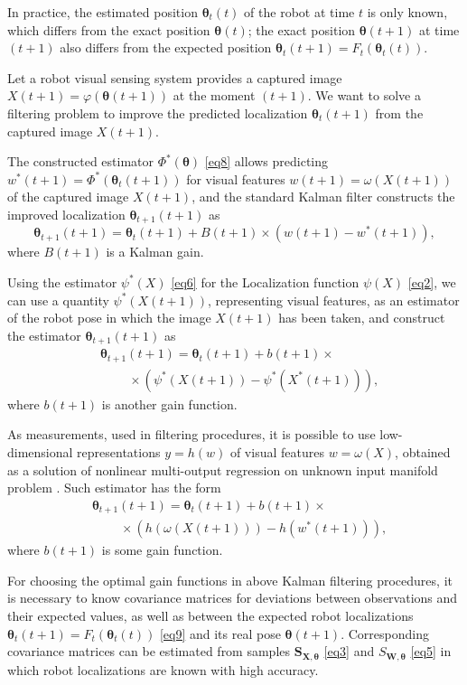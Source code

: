 \documentclass[conference]{IEEEtran} %
\def\mbtheta{{\bm\theta}}
\def\mbS{\mathbf{S}}
\begin{document}
In practice, the estimated position $\mbtheta_t(t)$ of the robot at time $t$ is only known, which differs from the exact position $\mbtheta(t)$; the exact position $\mbtheta(t+1)$ at time $(t+1)$ also differs from the expected position $\mbtheta_t(t+1) = F_t(\mbtheta_t(t))$.

Let a robot visual sensing system provides a captured image $X(t+1) = \varphi(\mbtheta(t+1))$ at the moment $(t+1)$. We want to solve a filtering problem to improve the predicted localization $\mbtheta_t(t+1)$ from the captured image $X(t+1)$.

The constructed estimator $\Phi^*(\mbtheta)$ \eqref{eq8} allows predicting $w^*(t+1) = \Phi^*(\mbtheta_t(t+1))$ for visual features $w(t+1) = \omega(X(t+1))$ of the captured image $X(t+1)$, and the standard Kalman filter \cite{bib5} constructs the improved localization $\mbtheta_{t+1}(t+1)$ as
\begin{equation*}
	\mbtheta_{t+1}(t+1) = \mbtheta_t(t+1) + B(t+1)\times(w(t+1) - w^*(t+1)),
\end{equation*}
where $B(t+1)$ is a Kalman gain.

Using the estimator $\psi^*(X)$ \eqref{eq6} for the Localization function $\psi(X)$ \eqref{eq2}, we can use a quantity $\psi^*(X(t+1))$, representing visual features, as an estimator of the robot pose in which the image $X(t+1)$ has been taken, and construct the estimator $\mbtheta_{t+1}(t+1)$ as
\begin{eqnarray*}
	&\mbtheta_{t+1}(t+1) = \mbtheta_t(t+1) + b(t+1)\times \\ & \;\;\;\;\;\;\;\;
    \times(\psi^*(X(t+1)) - \psi^*(X^*(t+1))),
\end{eqnarray*}
where $b(t+1)$ is another gain function.

As measurements, used in filtering procedures, it is possible to use low-dimensional representations $y = h(w)$ of visual features $w = \omega(X)$, obtained as a solution of nonlinear multi-output regression on unknown input manifold problem \cite{bib20}. Such estimator has the form
\begin{eqnarray*}
	& \mbtheta_{t+1}(t+1) = \mbtheta_t(t+1) + b(t+1)\times\\
     & \;\;\;\;\;\;\;\; \times(h(\omega(X(t+1))) - h(w^*(t+1))),
\end{eqnarray*}
where $b(t+1)$ is some gain function.

For choosing the optimal gain functions in above Kalman filtering procedures, it is necessary to know covariance matrices for deviations between observations and their expected values, as well as between the expected robot localizations $\mbtheta_t(t+1) = F_t(\mbtheta_t(t))$ \eqref{eq9} and its real pose $\mbtheta(t+1)$. Corresponding covariance matrices can be estimated from samples $\mbS_{\mathbf{X},\mbtheta}$ \eqref{eq3} and $S_{\mathbf{W},\mbtheta}$ \eqref{eq5} in which robot localizations are known with high accuracy.
\end{document}
